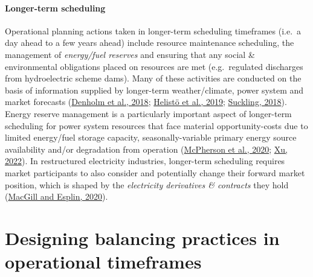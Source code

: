 \documentclass[12pt,a4paper,]{report}
\begin{document}
\hypertarget{longer-term-scheduling}{%
\paragraph{Longer-term scheduling}\label{longer-term-scheduling}}

Operational planning actions taken in longer-term scheduling timeframes
(i.e.~a day ahead to a few years ahead) include resource maintenance
scheduling, the management of \emph{energy/fuel reserves} and ensuring
that any social \& environmental obligations placed on resources are met
(e.g.~regulated discharges from hydroelectric scheme dams). Many of
these activities are conducted on the basis of information supplied by
longer-term weather/climate, power system and market forecasts
(\protect\hyperlink{ref-denholmHowLowCan2018}{Denholm et al., 2018};
\protect\hyperlink{ref-helistoIncludingOperationalAspects2019}{Helistö
et al., 2019};
\protect\hyperlink{ref-sucklingSeasonaltoDecadalClimateForecasting2018}{Suckling,
2018}). Energy reserve management is a particularly important aspect of
longer-term scheduling for power system resources that face material
opportunity-costs due to limited energy/fuel storage capacity,
seasonally-variable primary energy source availability and/or
degradation from operation
(\protect\hyperlink{ref-mcphersonImpactsStorageDispatch2020}{McPherson
et al., 2020}; \protect\hyperlink{ref-xuRoleModelingBattery2022}{Xu,
2022}). In restructured electricity industries, longer-term scheduling
requires market participants to also consider and potentially change
their forward market position, which is shaped by the \emph{electricity
derivatives \& contracts} they hold
(\protect\hyperlink{ref-macgillEndtoendElectricityMarket2020}{MacGill
and Esplin, 2020}).

\hypertarget{sec:lit_review-design}{%
\section{Designing balancing practices in operational
timeframes}\label{sec:lit_review-design}}
\end{document}
